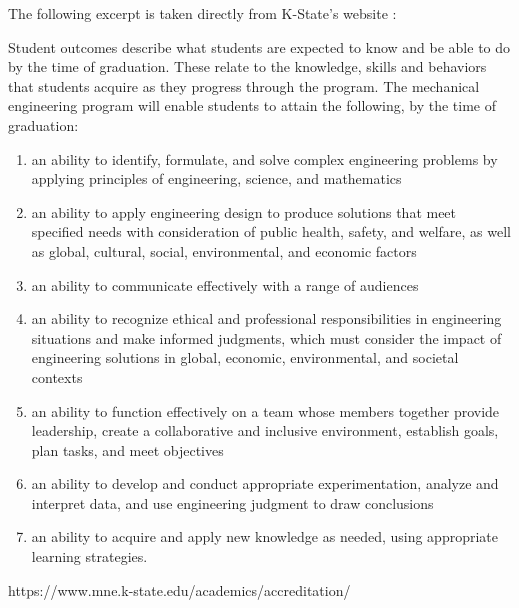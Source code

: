 The following excerpt is taken directly from K-State's website \cite{abet}:

Student outcomes describe what students are expected to know and be 
able to do by the time of graduation. These relate to the knowledge, 
skills and behaviors that students acquire as they progress through 
the program. The mechanical engineering program will enable students 
to attain the following, by the time of graduation:
\begin{enumerate}
    \item an ability to identify, formulate, and solve complex engineering problems by applying principles of engineering, science, and mathematics
    \item an ability to apply engineering design to produce solutions that meet specified needs with consideration of public health, safety, and welfare, as well as global, cultural, social, environmental, and economic factors
    \item an ability to communicate effectively with a range of audiences
    \item an ability to recognize ethical and professional responsibilities in engineering situations and make informed judgments, which must consider the impact of engineering solutions in global, economic, environmental, and societal contexts
    \item an ability to function effectively on a team whose members together provide leadership, create a collaborative and inclusive environment, establish goals, plan tasks, and meet objectives
    \item an ability to develop and conduct appropriate experimentation, analyze and interpret data, and use engineering judgment to draw conclusions
    \item an ability to acquire and apply new knowledge as needed, using appropriate learning strategies.
\end{enumerate}

https://www.mne.k-state.edu/academics/accreditation/